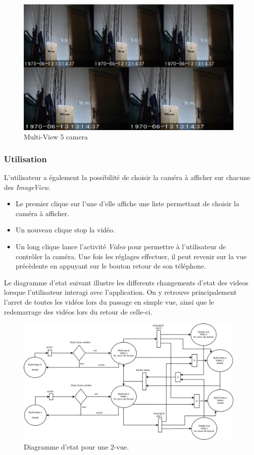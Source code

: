 \begin{figure}[H]
  \label{5cam.eps}
  \centering
   \includegraphics[scale=0.4]{Images/5cam.eps}
  \caption{Multi-View 5 camera}
\end{figure}  
\subsubsection{Utilisation}
L'utilisateur a également la possibilité de choisir la caméra à afficher sur chacune des \textit{ImageView}. 
\begin{itemize}
\item Le premier clique sur l'une d'elle affiche une liste permettant de
choisir la caméra à afficher.
\item Un nouveau clique stop la vidéo.
\item Un long clique lance l'activité \textit{Video} pour permettre à
l'utilisateur de contrôler la caméra. Une fois les réglages effectuer, il peut
revenir sur la vue précèdente en appuyant sur le bouton retour de son téléphone.
\end{itemize}
Le diagramme d'etat suivant illustre les differents changements d'etat des
videos lorsque l'utilisateur interagi avec l'application. On y retrouve
principalement l'arret de toutes les vidéos lors du passage en simple vue, ainsi
que le redemarrage des vidéos lors du retour de celle-ci.
\begin{figure}[H]
  \label{DiagrammeSequenceMultiView}
  \centering
   \includegraphics[scale=0.55]{Images/DiagrammeSequenceMultiView.png}
  \caption{Diagramme d'etat pour une 2-vue.}
\end{figure}  


